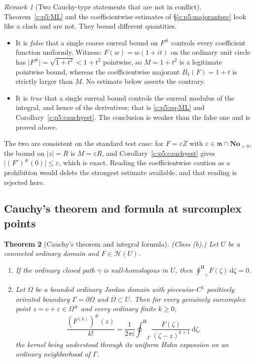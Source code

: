 \documentclass[11pt,a4paper]{article}
\numberwithin{equation}{section}
\newtheorem{theorem}{Theorem}[section]
\theoremstyle{definition}
\theoremstyle{remark}
\newtheorem{remark}[theorem]{Remark}
\theoremstyle{plain}
\newcommand{\No}{\mathbf{No}}
\newcommand{\mm}{\mathfrak m}
\newcommand{\tm}{t}
\newcommand{\halo}[1]{#1^{\#}}
\newcommand{\ev}[1]{#1^{\#}}
\newcommand{\Hc}{\mathcal H}
\newcommand{\ointH}{{\oint^{\mathrm H}}}
\newcommand{\abs}[1]{\lvert #1\rvert}
\newcommand{\dd}{\mathrm d}
\begin{document}
\begin{remark}[Two Cauchy-type statements that are not in conflict]
\label{c:p5:rk-noclash}
Theorem~\ref{c:p5:ML} and the coefficientwise estimates of
\S\ref{c:p5:majorantsec} look like a clash and are not. They bound
different quantities.
\begin{itemize}
\item It is \emph{false} that a single coarse surreal bound on $\ev F$
controls every coefficient function uniformly. Witness:
$F(w)=w(1+i\tm)$ on the ordinary unit circle has
$\abs{\ev F}=\sqrt{1+\tm^{2}}<1+\tm^{2}$ pointwise, so $M=1+\tm^{2}$ is
a legitimate pointwise bound, whereas the coefficientwise majorant
$B_1(F)=1+\tm$ is strictly larger than $M$. No estimate below asserts
the contrary.
\item It is \emph{true} that a single surreal bound controls the surreal
modulus of the integral, and hence of the derivatives; that is
\eqref{c:p5:eq-ML} and Corollary~\ref{c:p5:cauchyest}. The conclusion is
weaker than the false one and is proved above.
\end{itemize}
The two are consistent on the standard test case: for $F=\varepsilon Z$
with $\varepsilon\in\mm\cap\No_{>0}$, the bound on $\abs z=R$ is $M=\varepsilon R$,
and Corollary~\ref{c:p5:cauchyest} gives
$\abs{\ev{(F')}(0)}\le\varepsilon$, which is exact. Reading the
coefficientwise caution as a prohibition would delete the strongest
estimate available, and that reading is rejected here.
\end{remark}

\subsection{Cauchy's theorem and formula at surcomplex points}
\label{c:p5:cauchysec}

\begin{theorem}[Cauchy's theorem and integral formula]
\label{c:p5:cauchy}
\emph{(Class (b).)} Let $U$ be a connected ordinary domain and
$F\in\Hc(U)$.
\begin{enumerate}[label=(\roman*)]
\item If the ordinary closed path $\gamma$ is null-homologous in $U$,
then $\ointH_{\gamma}F(\zeta)\,\dd\zeta=0$.
\item Let $\Omega$ be a bounded ordinary Jordan domain with
piecewise-$C^{1}$ positively oriented boundary
$\Gamma=\partial\Omega$ and $\overline\Omega\subset U$. Then for every
genuinely surcomplex point $z=c+\varepsilon\in\halo\Omega$ and every
ordinary finite $k\ge0$,
\begin{equation}\label{c:p5:eq-cauchy}
 \frac{\ev{(F^{(k)})}(z)}{k!}
 =\frac1{2\pi i}\ointH_{\Gamma}
    \frac{F(\zeta)}{(\zeta-z)^{k+1}}\,\dd\zeta,
\end{equation}
the kernel being understood through its uniform Hahn expansion on an
ordinary neighborhood of $\Gamma$.
\end{enumerate}
\end{theorem}
\end{document}
